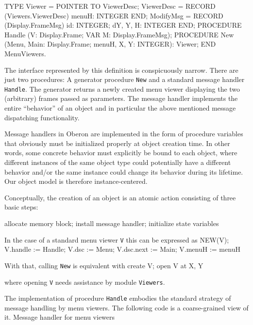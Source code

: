   TYPE
    Viewer = POINTER TO ViewerDesc;
    ViewerDesc = RECORD (Viewers.ViewerDesc)
      menuH: INTEGER
    END;
    ModifyMsg = RECORD (Display.FrameMsg)
      id: INTEGER;
      dY, Y, H: INTEGER
   END;
   PROCEDURE Handle (V: Display.Frame; VAR M: Display.FrameMsg);
   PROCEDURE New (Menu, Main: Display.Frame;
                  menuH, X, Y: INTEGER): Viewer;
END MenuViewers.
\endtt

The interface represented by this definition is conspicuously
narrow. There are just two procedures: A generator procedure {\tt New\/} and a
standard message handler {\tt Handle\/}. The generator returns a newly created
menu viewer displaying the two (arbitrary) frames passed as
parameters. The message handler implements the entire ``behavior'' of an
object and in particular the above mentioned message dispatching
functionality.

Message handlers in Oberon are implemented in the form of procedure
variables that obviously must be initialized properly at object
creation time. In other words, some concrete behavior must explicitly
be bound to each object, where different instances of the same object
type could potentially have a different behavior and/or the same
instance could change its behavior during its lifetime. Our object
model is therefore instance-centered.

Conceptually, the creation of an object is an atomic action consisting
of three basic steps:

allocate memory block; install message handler; initialize state variables

\noindent In the case of a standard menu viewer {\tt V\/} this can be expressed as
\begintt
NEW(V);
V.handle := Handle;
V.dsc := Menu;
V.dsc.next := Main;
V.menuH := menuH
\endtt

\noindent With that, calling {\tt New\/} is equivalent with
\begintt
create V; open V at X, Y
\endtt

\noindent where opening {\tt V\/} needs assistance by module {\tt Viewers\/}.

The implementation of procedure {\tt Handle\/} embodies the standard strategy of message handling by
menu viewers. The following code is a coarse-grained view of it.
\begintt
Message handler for menu viewers

